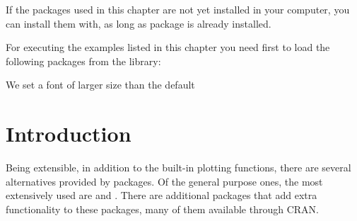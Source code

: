 \documentclass[krantz2]{krantz}\usepackage{knitr}%
\begin{document}
If the packages used in this chapter are not yet installed in your computer, you can install them with, as long as package  is already installed.

\begin{knitrout}\footnotesize
{}\color{fgcolor}\begin{kframe}
\begin{alltt}
\hlopt{::}
\end{alltt}
\end{kframe}
\end{knitrout}

For executing the examples listed in this chapter you need first to load the following packages from the library:

\begin{knitrout}\footnotesize
{}\color{fgcolor}\begin{kframe}
\begin{alltt}
\end{alltt}
\end{kframe}
\end{knitrout}

We set a font of larger size than the default
\begin{knitrout}\footnotesize
{}\color{fgcolor}\begin{kframe}
\begin{alltt}
\hlstd{(}\hlstd{(}\hlstd{))}
\end{alltt}
\end{kframe}
\end{knitrout}



\section{Introduction}

Being \Rlang extensible, in addition to the built-in plotting functions, there are several alternatives provided by packages. Of the general purpose ones, the most extensively used are  \autocite{Sarkar2008} and \ggplot \autocite{Wickham2016}. There are additional packages that add extra functionality to these packages, many of them available through CRAN.
\end{document}

